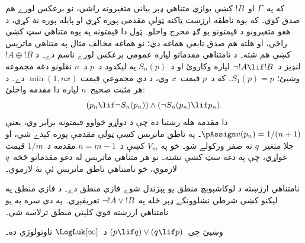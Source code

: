 \documentclass[../../../include/open-logic-section]{subfiles}
\begin{document}
که په~$\Gamma$ او~$!B$ کښې يوازې متناهي ډېر بياني متغيرونه
راشي، نو برعکس لورے هم صدق کوي۔ که يوه ناطقه ارزښت ټاکنه ټولې
مقدمې پوره کړي او پايله پوره نۀ کړي، د هغو متغيرونو د قيمتونو
يو ګډ مخرج واخلو۔ ټول دا قيمتونه په يوه متناهي سټ کښې راځي، او
هلته هم صدق تابعې هماغه دي؛ نو هماغه مخالف مثال په متناهي
ماتريس کښې هم شته۔
د نامتناهي مقدماتو لپاره عمومي برعکس لورے ناسم دے۔ د
$!A \oplus !B$ لنډيز د~$\lnot !A \lif !B$ لپاره وکاروئ او
د~$S_n(p)$ په ليکدود د~$p$ د~$n$ نقلونو دغه مجموعه وښيئ؛
$S_1(p)=p$۔ که د~$p$ قيمت~$x$ وي، د دې مجموعې قيمت
$\min(1,nx)$ دے۔ د هر مثبت صحيح~$n$ لپاره دا مقدمه واخلئ:
\[
(p_n \lif \lnot S_n(p_n)) \land (\lnot S_n(p_n) \lif p_n).
\]
دا مقدمه هله رښتيا ده چې د دواړو خواوو قيمتونه برابر وي، يعنې
$\pAssign v(p_n)=1/(n+1)$۔ په ناطق ماتريس کښې ټولې مقدمې
پوره کېدے شي، او جلا متغير~$q$ ته صفر ورکولے شو۔ خو په
$V_m$ کښې د~$n=m-1$ مقدمه د~$1/m$ قيمت غواړي، چې په دغه
سټ کښې نشته۔ نو هر متناهي ماتريس له دغو مقدماتو څخه~$q$
لازموي، خو نامتناهي ناطق ماتريس ئې نۀ لازموي۔

نامتناهي ارزښته د لوکاشېوېچ منطق يو پېژندل شوے فازي منطق دے۔
د فازي منطق په ليکنو کښې شرطي نښلوونکے ډېر ځله په~$\lnot !A \lor !B$
تعريفېږي۔ په دې سره به يو نامتناهي ارزښته قوي کليني منطق ترلاسه شي۔

\begin{prob}
  وښيئ چې~$(p \lif q) \lor (q \lif p)$ د~$\LogLuk[\infty]$
  تاوتولوژي ده۔
\end{prob}
\end{document}
